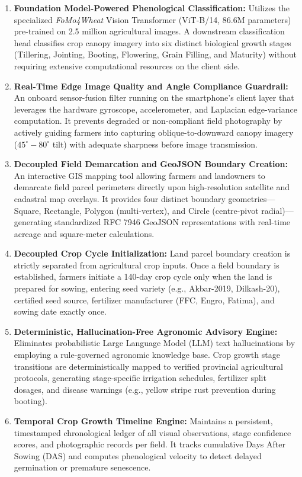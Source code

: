 \documentclass{FastFyp}
\begin{document}
\begin{enumerate}
    \item \textbf{Foundation Model-Powered Phenological Classification:} Utilizes the specialized \textit{FoMo4Wheat} Vision Transformer (ViT-B/14, 86.6M parameters) pre-trained on 2.5 million agricultural images. A downstream classification head classifies crop canopy imagery into six distinct biological growth stages (Tillering, Jointing, Booting, Flowering, Grain Filling, and Maturity) without requiring extensive computational resources on the client side.
    \item \textbf{Real-Time Edge Image Quality and Angle Compliance Guardrail:} An onboard sensor-fusion filter running on the smartphone's client layer that leverages the hardware gyroscope, accelerometer, and Laplacian edge-variance computation. It prevents degraded or non-compliant field photography by actively guiding farmers into capturing oblique-to-downward canopy imagery ($45^\circ - 80^\circ$ tilt) with adequate sharpness before image transmission.
    \item \textbf{Decoupled Field Demarcation and GeoJSON Boundary Creation:} An interactive GIS mapping tool allowing farmers and landowners to demarcate field parcel perimeters directly upon high-resolution satellite and cadastral map overlays. It provides four distinct boundary geometries---Square, Rectangle, Polygon (multi-vertex), and Circle (centre-pivot radial)---generating standardized RFC 7946 GeoJSON representations with real-time acreage and square-meter calculations.
    \item \textbf{Decoupled Crop Cycle Initialization:} Land parcel boundary creation is strictly separated from agricultural crop inputs. Once a field boundary is established, farmers initiate a 140-day crop cycle only when the land is prepared for sowing, entering seed variety (e.g., Akbar-2019, Dilkash-20), certified seed source, fertilizer manufacturer (FFC, Engro, Fatima), and sowing date exactly once.
    \item \textbf{Deterministic, Hallucination-Free Agronomic Advisory Engine:} Eliminates probabilistic Large Language Model (LLM) text hallucinations by employing a rule-governed agronomic knowledge base. Crop growth stage transitions are deterministically mapped to verified provincial agricultural protocols, generating stage-specific irrigation schedules, fertilizer split dosages, and disease warnings (e.g., yellow stripe rust prevention during booting).
    \item \textbf{Temporal Crop Growth Timeline Engine:} Maintains a persistent, timestamped chronological ledger of all visual observations, stage confidence scores, and photographic records per field. It tracks cumulative Days After Sowing (DAS) and computes phenological velocity to detect delayed germination or premature senescence.

\end{enumerate}
\end{document}
